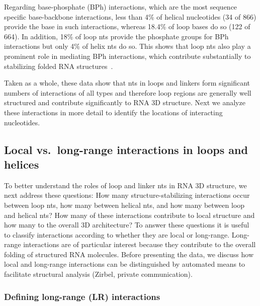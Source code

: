 Regarding base-phosphate (BPh) interactions, which are the most sequence
specific base-backbone interactions, less than 4\% of helical nucleotides (34 of
866) provide the base in such interactions, whereas 18.4\% of loop bases do so
(122 of 664). In addition, 18\% of loop nts provide the phosphate groups for BPh
interactions but only 4\% of helix nts do so. This shows that loop nts also play
a prominent role in mediating BPh interactions, which contribute substantially
to stabilizing folded RNA structures~\cite{Zirbel2009, Sponer2010}. 

Taken as a whole, these data show that nts in loops and linkers form significant
numbers of interactions of all types and therefore loop regions are generally
well structured and contribute significantly to RNA 3D structure. Next we
analyze these interactions in more detail to identify the locations of
interacting nucleotides. 

\subsection{Local vs.\ long-range interactions in loops and helices}

To better understand the roles of loop and linker nts in RNA 3D structure, we
next address these questions: How many structure-stabilizing interactions occur
between loop nts, how many between helical nts, and how many between loop and
helical nts? How many of these interactions contribute to local structure and
how many to the overall 3D architecture? To answer these questions it is useful
to classify interactions according to whether they are local or long-range.
Long-range interactions are of particular interest because they contribute to
the overall folding of structured RNA molecules. Before presenting the data, we
discuss how local and long-range interactions can be distinguished by automated
means to facilitate structural analysis (Zirbel, private communication). 

\subsubsection{Defining long-range (LR) interactions}

